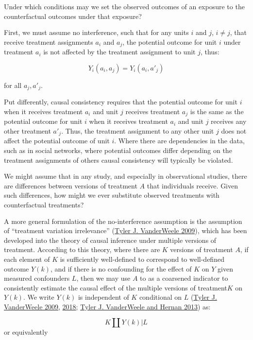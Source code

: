 \documentclass[
  singlecolumn]{report}
\begin{document}
Under which conditions may we set the observed outcomes of an exposure
to the counterfactual outcomes under that exposure?

First, we must assume no interference, such that for any units \(i\) and
\(j\), \(i \neq j\), that receive treatment assignments \(a_i\) and
\(a_j\), the potential outcome for unit \(i\) under treatment \(a_i\) is
not affected by the treatment assignment to unit \(j\), thus:

\[Y_i(a_i, a_j) = Y_i(a_i, a'_j)\]

for all \(a_j, a'_j\).

Put differently, causal consistency requires that the potential outcome
for unit \(i\) when it receives treatment \(a_i\) and unit \(j\)
receives treatment \(a_j\) is the same as the potential outcome for unit
\(i\) when it receives treatment \(a_i\) and unit \(j\) receives any
other treatment \(a'_j\). Thus, the treatment assignment to any other
unit \(j\) does not affect the potential outcome of unit \(i\). Where
there are dependencies in the data, such as in social networks, where
potential outcomes differ depending on the treatment assignments of
others causal consistency will typically be violated.

We might assume that in any study, and especially in observational
studies, there are differences between versions of treatment \(A\) that
individuals receive. Given such differences, how might we ever
substitute observed treatments with counterfactual treatments?

A more general formulation of the no-interference assumption is the
assumption of ``treatment variation irrelevance''
(\protect\hyperlink{ref-vanderweele2009}{Tyler J. VanderWeele 2009}),
which has been developed into the theory of causal inference under
multiple versions of treatment. According to this theory, where there
are \(K\) versions of treatment \(A\), if each element of \(K\) is
sufficiently well-defined to correspond to well-defined outcome
\(Y(k)\), and if there is no confounding for the effect of \(K\) on
\(Y\) given measured confounders \(L\), then we may use \(A\) to as a
coarsened indicator to consistently estimate the causal effect of the
multiple versions of treatment\(K\) on \(Y(k)\). We write \(Y(k)\) is
independent of \(K\) conditional on \(L\)
(\protect\hyperlink{ref-vanderweele2009}{Tyler J. VanderWeele 2009},
\protect\hyperlink{ref-vanderweele2018}{2018};
\protect\hyperlink{ref-vanderweele2013}{Tyler J. VanderWeele and Hernan
2013}) as:

\[K \coprod Y(k) | L\] or equivalently
\end{document}

